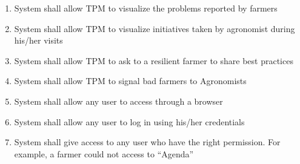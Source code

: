 \begin{enumerate} [label=\textbf{R.\arabic*}]
    \item System shall allow TPM to visualize the problems reported by farmers
    \item System shall allow TPM to visualize initiatives taken by agronomist during his/her visits
    \item System shall allow TPM to ask to a resilient farmer to share best practices
    \item System shall allow TPM to signal bad farmers to Agronomists
    \item System shall allow any user to access through a browser
    \item System shall allow any user to log in using his/her credentials
    \item System shall give access to any user who have the right permission. For example, a farmer could not access to “Agenda”
\end{enumerate}

